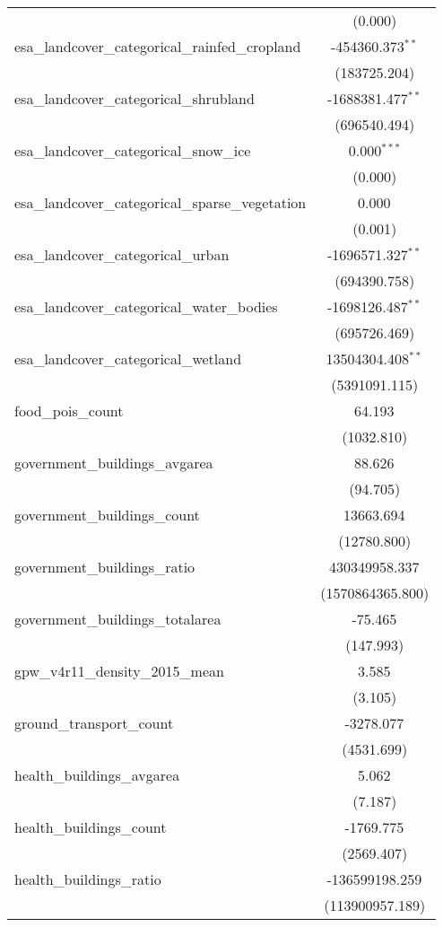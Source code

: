 \begin{table}[!htbp]
\begin{tabular}{@{\extracolsep{5pt}}lc}
  & (0.000) \\
 esa_landcover_categorical_rainfed_cropland & -454360.373$^{**}$ \\
  & (183725.204) \\
 esa_landcover_categorical_shrubland & -1688381.477$^{**}$ \\
  & (696540.494) \\
 esa_landcover_categorical_snow_ice & 0.000$^{***}$ \\
  & (0.000) \\
 esa_landcover_categorical_sparse_vegetation & 0.000$^{}$ \\
  & (0.001) \\
 esa_landcover_categorical_urban & -1696571.327$^{**}$ \\
  & (694390.758) \\
 esa_landcover_categorical_water_bodies & -1698126.487$^{**}$ \\
  & (695726.469) \\
 esa_landcover_categorical_wetland & 13504304.408$^{**}$ \\
  & (5391091.115) \\
 food_pois_count & 64.193$^{}$ \\
  & (1032.810) \\
 government_buildings_avgarea & 88.626$^{}$ \\
  & (94.705) \\
 government_buildings_count & 13663.694$^{}$ \\
  & (12780.800) \\
 government_buildings_ratio & 430349958.337$^{}$ \\
  & (1570864365.800) \\
 government_buildings_totalarea & -75.465$^{}$ \\
  & (147.993) \\
 gpw_v4r11_density_2015_mean & 3.585$^{}$ \\
  & (3.105) \\
 ground_transport_count & -3278.077$^{}$ \\
  & (4531.699) \\
 health_buildings_avgarea & 5.062$^{}$ \\
  & (7.187) \\
 health_buildings_count & -1769.775$^{}$ \\
  & (2569.407) \\
 health_buildings_ratio & -136599198.259$^{}$ \\
  & (113900957.189) \\

\end{tabular}
\end{table}
